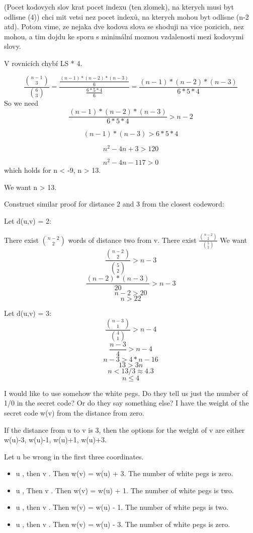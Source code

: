 (Pocet kodovych slov krat pocet indexu (ten zlomek), na kterych musi byt odlisne (4)) chci mit vetsi nez pocet indexů, na kterych mohou byt odlisne (n-2 atd). Potom vime, ze nejaka dve kodova slova se shoduji na vice pozicich, nez mohou, a tim dojdu ke sporu s minimální moznou vzdalenosti mezi kodovymi slovy. 

V rovnicích chybí LS * 4.

\[
\frac{\binom{n-1}{3}}{\binom{6}{3}} = \frac{\frac{(n-1)*(n-2)*(n-3)}{6}}{\frac{6*5*4}{6}} = \frac{(n-1)*(n-2)*(n-3)}{6*5*4}
\]
So we need 
\[
\frac{(n-1)*(n-2)*(n-3)}{6*5*4} > n-2
\]

\[(n-1)*(n-3) > 6*5*4\]

\[
n^2-4n+3 > 120
\]

\[
n^2-4n-117 > 0
\]
which holds for n < -9, n > 13. 

We want n > 13. 

Construct similar proof for distance 2 and 3 from the closest codeword:

Let d(u,v) = 2:

There exist $\binom{n-2}{2}$ words of distance two from v. There exist $\frac{\binom{n-2}{2}}{\binom{5}{2}}$
We want 
\[
\frac{\binom{n-2}{2}}{\binom{5}{2}} > n-3
\]
\[\frac{(n-2)*(n-3)}{20} > n-3\]
\[n-2 > 20\]
\[n > 22\]

Let d(u,v) = 3:
\[\frac{\binom{n-3}{1}}{\binom{4}{1}} > n-4\]
\[\frac{n-3}{4} > n-4\]
\[n-3 > 4*n-16\]
\[13 > 3n\]
\[n < 13/3 \approx 4.3\]
\[n \leq 4\]

I would like to use somehow the white pegs. Do they tell us just the number of 1/0 in the secret code? Or do they say something else? I have the weight of the secret code w(v) from the distance from zero. 

If the distance from u to v is 3, then the options for the weight of v are either w(u)-3, w(u)-1, w(u)+1, w(u)+3. 

Let u be wrong in the first three coordinates. 

\begin{itemize}
    \item u , then v . Then w(v) = w(u) + 3. The number of white pegs is zero. 
    \item u , Then v . Then w(v) = w(u) + 1. The number of white pegs is two.
    \item u , then v . Then w(v) = w(u) - 1. The number of white pegs is two. 
    \item u , then v . Then w(v) = w(u) - 3. The number of white pegs is zero. 
\end{itemize}


